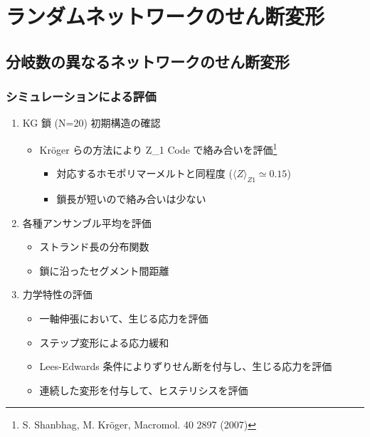 \documentclass[aspectratio=169,11pt, dvipdfmx]{beamer}
\begin{document}
\section{ランダムネットワークのせん断変形}
\subsection{分岐数の異なるネットワークのせん断変形}
\begin{frame}
	\frametitle{シミュレーションによる評価}
	\begin{enumerate}
		\item KG 鎖 (N=20) 初期構造の確認
			\begin{itemize}
				\item Kr\"{o}ger らの方法により Z\_1 Code で絡み合いを評価\footnote[1]{
					\scriptsize{S. Shanbhag, M. Kr\"{o}ger, Macromol. 40 2897 (2007)}
				}
				\begin{itemize}
					\item 対応するホモポリマーメルトと同程度 ($\langle Z \rangle_{Z1} \simeq 0.15$)
					\item 鎖長が短いので絡み合いは少ない
				\end{itemize}
			\end{itemize}
		\item 各種アンサンブル平均を評価
			\begin{itemize}
				\item ストランド長の分布関数
				\item 鎖に沿ったセグメント間距離
			\end{itemize}
		\item 力学特性の評価
			\begin{itemize}
				\item 一軸伸張において、生じる応力を評価
				\item ステップ変形による応力緩和
				\item \alert{Lees-Edwards 条件によりずりせん断}を付与し、生じる応力を評価
				\item 連続した変形を付与して、ヒステリシスを評価
			\end{itemize}	
	\end{enumerate}
\end{frame}
\end{document}
